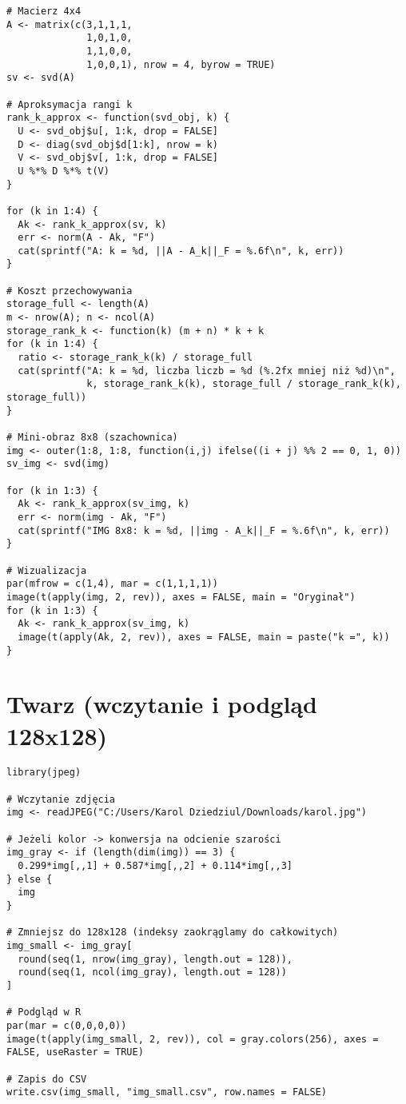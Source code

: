 \documentclass[12pt]{article}
\begin{document}
\begin{lstlisting}
# Macierz 4x4
A <- matrix(c(3,1,1,1,
              1,0,1,0,
              1,1,0,0,
              1,0,0,1), nrow = 4, byrow = TRUE)
sv <- svd(A)

# Aproksymacja rangi k
rank_k_approx <- function(svd_obj, k) {
  U <- svd_obj$u[, 1:k, drop = FALSE]
  D <- diag(svd_obj$d[1:k], nrow = k)
  V <- svd_obj$v[, 1:k, drop = FALSE]
  U %*% D %*% t(V)
}

for (k in 1:4) {
  Ak <- rank_k_approx(sv, k)
  err <- norm(A - Ak, "F")
  cat(sprintf("A: k = %d, ||A - A_k||_F = %.6f\n", k, err))
}

# Koszt przechowywania
storage_full <- length(A)
m <- nrow(A); n <- ncol(A)
storage_rank_k <- function(k) (m + n) * k + k
for (k in 1:4) {
  ratio <- storage_rank_k(k) / storage_full
  cat(sprintf("A: k = %d, liczba liczb = %d (%.2fx mniej niż %d)\n",
              k, storage_rank_k(k), storage_full / storage_rank_k(k), storage_full))
}

# Mini-obraz 8x8 (szachownica)
img <- outer(1:8, 1:8, function(i,j) ifelse((i + j) %% 2 == 0, 1, 0))
sv_img <- svd(img)

for (k in 1:3) {
  Ak <- rank_k_approx(sv_img, k)
  err <- norm(img - Ak, "F")
  cat(sprintf("IMG 8x8: k = %d, ||img - A_k||_F = %.6f\n", k, err))
}

# Wizualizacja
par(mfrow = c(1,4), mar = c(1,1,1,1))
image(t(apply(img, 2, rev)), axes = FALSE, main = "Oryginał")
for (k in 1:3) {
  Ak <- rank_k_approx(sv_img, k)
  image(t(apply(Ak, 2, rev)), axes = FALSE, main = paste("k =", k))
}
\end{lstlisting}

\section*{Twarz (wczytanie i podgląd 128x128)}
\begin{lstlisting}
library(jpeg)

# Wczytanie zdjęcia
img <- readJPEG("C:/Users/Karol Dziedziul/Downloads/karol.jpg")

# Jeżeli kolor -> konwersja na odcienie szarości
img_gray <- if (length(dim(img)) == 3) {
  0.299*img[,,1] + 0.587*img[,,2] + 0.114*img[,,3]
} else {
  img
}

# Zmniejsz do 128x128 (indeksy zaokrąglamy do całkowitych)
img_small <- img_gray[
  round(seq(1, nrow(img_gray), length.out = 128)),
  round(seq(1, ncol(img_gray), length.out = 128))
]

# Podgląd w R
par(mar = c(0,0,0,0))
image(t(apply(img_small, 2, rev)), col = gray.colors(256), axes = FALSE, useRaster = TRUE)

# Zapis do CSV
write.csv(img_small, "img_small.csv", row.names = FALSE)

\end{lstlisting}
\end{document}
